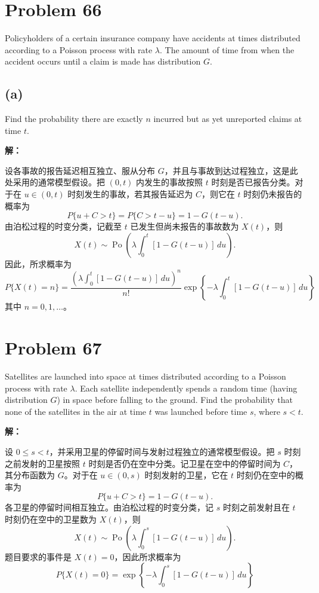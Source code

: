 \documentclass[12pt,a4paper]{article}
\begin{document}
\section{Problem 66}

Policyholders of a certain insurance company have accidents at times distributed according to a Poisson process with rate $\lambda$. The amount of time from when the accident occurs until a claim is made has distribution $G$.

\subsection*{(a)}

\noindent Find the probability there are exactly $n$ incurred but as yet unreported claims at time $t$.

\begin{answerbox}
\textbf{解：}

设各事故的报告延迟相互独立、服从分布 $G$，并且与事故到达过程独立，这是此处采用的通常模型假设。把 $(0,t)$ 内发生的事故按照 $t$ 时刻是否已报告分类。对于在 $u\in(0,t)$ 时刻发生的事故，若其报告延迟为 $C$，则它在 $t$ 时刻仍未报告的概率为
$$
P\{u+C>t\}=P\{C>t-u\}=1-G(t-u).
$$
由泊松过程的时变分类，记截至 $t$ 已发生但尚未报告的事故数为 $X(t)$，则
$$
X(t)\sim\operatorname{Po}\left(\lambda\int_0^t[1-G(t-u)]\,du\right).
$$
因此，所求概率为
$$
P\{X(t)=n\}
=\frac{\left(\lambda\int_0^t[1-G(t-u)]\,du\right)^n}{n!}
\exp\left\{-\lambda\int_0^t[1-G(t-u)]\,du\right\}
$$
其中 $n=0,1,\ldots$。

\end{answerbox}

\section{Problem 67}

Satellites are launched into space at times distributed according to a Poisson process with rate $\lambda$. Each satellite independently spends a random time (having distribution $G$) in space before falling to the ground. Find the probability that none of the satellites in the air at time $t$ was launched before time $s$, where $s<t$.

\begin{answerbox}
\textbf{解：}

设 $0\le s<t$，并采用卫星的停留时间与发射过程独立的通常模型假设。把 $s$ 时刻之前发射的卫星按照 $t$ 时刻是否仍在空中分类。记卫星在空中的停留时间为 $C$，其分布函数为 $G$。对于在 $u\in(0,s)$ 时刻发射的卫星，它在 $t$ 时刻仍在空中的概率为
$$
P\{u+C>t\}=1-G(t-u).
$$
各卫星的停留时间相互独立。由泊松过程的时变分类，记 $s$ 时刻之前发射且在 $t$ 时刻仍在空中的卫星数为 $X(t)$，则
$$
X(t)\sim\operatorname{Po}\left(\lambda\int_0^s[1-G(t-u)]\,du\right).
$$
题目要求的事件是 $X(t)=0$，因此所求概率为
$$
P\{X(t)=0\}=\exp\left\{-\lambda\int_0^s[1-G(t-u)]\,du\right\}
$$

\end{answerbox}
\end{document}
